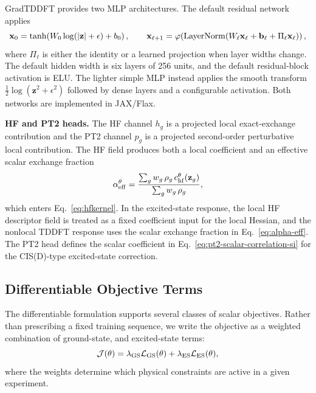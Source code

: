 GradTDDFT provides two MLP architectures. The default residual
network applies
\begin{equation}
  \mathbf{x}_0=\tanh\!\left(W_0\log(|\mathbf{z}|+\epsilon)+b_0\right),
  \qquad
  \mathbf{x}_{\ell+1}
  =
  \varphi\!\left(
    {\rm LayerNorm}(W_\ell\mathbf{x}_{\ell}+\mathbf{b}_\ell
    +\Pi_\ell\mathbf{x}_{\ell})
  \right),
  \label{eq:residual-mlp}
\end{equation}
where $\Pi_\ell$ is either the identity or a learned projection when
layer widths change. The default hidden width is six layers of 256
units, and the default residual-block activation is ELU. The lighter
simple MLP instead applies the smooth transform
$\frac{1}{2}\log(\mathbf{z}^2+\epsilon^2)$ followed by dense layers
and a configurable activation. Both networks are implemented in
JAX/Flax.\cite{Flax}

\textbf{HF and PT2 heads.} The HF channel $h_g$ is a projected local
exact-exchange contribution and the PT2 channel $p_g$ is a projected
second-order perturbative local contribution. The HF field produces
both a local coefficient and an effective scalar exchange fraction
\begin{equation}
  \alpha_{\rm eff}^{\theta}
  =
  \frac{\sum_g w_g\,\rho_g\,c_{\rm hf}^{\theta}(\mathbf{z}_g)}
       {\sum_g w_g\,\rho_g},
  \label{eq:alpha-eff}
\end{equation}
which enters Eq.~\eqref{eq:hfkernel}. In the excited-state response,
the local HF descriptor field is treated as a fixed coefficient input
for the local Hessian, and the nonlocal TDDFT response uses the
scalar exchange fraction in Eq.~\eqref{eq:alpha-eff}. The PT2 head
defines the scalar coefficient in Eq.~\eqref{eq:pt2-scalar-correlation-si}
for the CIS(D)-type excited-state correction.

\subsection{Differentiable Objective Terms}
\label{sec:training}

The differentiable formulation supports several classes of scalar
objectives. Rather than prescribing a fixed training sequence, we
write the objective as a weighted combination of ground-state,
and excited-state terms:
\begin{equation}
  \mathcal{J}(\theta)
  =
  \lambda_{\rm GS}\mathcal{L}_{\rm GS}(\theta)
  +
  \lambda_{\rm ES}\mathcal{L}_{\rm ES}(\theta),
  \label{eq:composite-loss}
\end{equation}
where the weights determine which physical constraints are active in
a given experiment.

